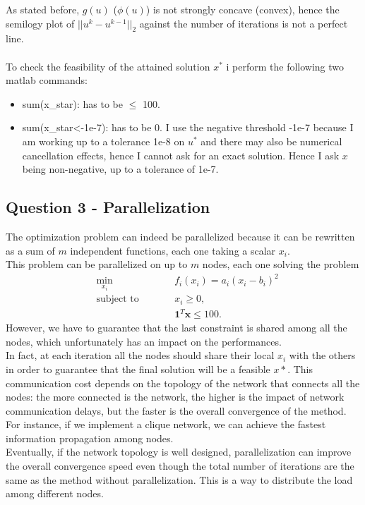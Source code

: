 \documentclass[]{article}
\begin{document}
As stated before, $g(u)$ ($\phi(u)$) is not strongly concave (convex), hence the semilogy plot of  $||u^k-u^{k-1}||_2$ against the number of iterations is not a perfect line.\\\\
To check the feasibility of the attained solution $x^*$ i perform the following two matlab commands:
\begin{itemize}
	\item sum(x\_star): has to be $\leq$ 100.
	\item sum(x\_star<-1e-7): has to be 0. I use the negative threshold -1e-7 because I am working up to a tolerance 1e-8 on $u^*$ and there may also be numerical cancellation effects, hence I cannot ask for an exact solution. Hence I ask $x$ being non-negative, up to a tolerance of 1e-7.
\end{itemize}


\subsection*{Question 3 - Parallelization}
The optimization problem can indeed be parallelized because it can be rewritten as a sum of $m$ independent functions, each one taking a scalar $x_i$.\\
This problem can be parallelized on up to $m$ nodes, each one solving the problem
\begin{subequations}
	\begin{alignat*}{2}
		&\!\min_{x_i} &\qquad& f_i(x_i) = a_i(x_i-b_i)^2\\
		&\text{subject to} &      & x_i\geq0,\\
		&&&  \mathbf{1}^T\mathbf{x} \leq 100.
	\end{alignat*}
\end{subequations}
However, we have to guarantee that the last constraint is shared among all the nodes, which unfortunately has an impact on the performances.\\
In fact, at each iteration all the nodes should share their local $x_i$ with the others in order to guarantee that the final solution will be a feasible $x*$. This communication cost depends on the topology of the network that connects all the nodes: the more connected is the network, the higher is the impact of network communication delays, but the faster is the overall convergence of the method.\\
For instance, if we implement a clique network, we can achieve the fastest information propagation among nodes.\\
Eventually, if the network topology is well designed, parallelization can improve the overall convergence speed even though the total number of iterations are the same as the method without parallelization. This is a way to distribute the load among different nodes.\\
\end{document}
